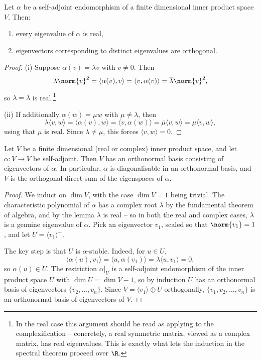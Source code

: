 \begin{lemma}
    Let $\alpha$ be a self-adjoint endomorphism of a finite dimensional inner product space $V$. Then:
    \begin{enumerate}[label=(\roman*)]
        \item every eigenvalue of $\alpha$ is real,
        \item eigenvectors corresponding to distinct eigenvalues are orthogonal.
    \end{enumerate}
\end{lemma}
\begin{proof}
    (i) Suppose $\alpha(v) = \lambda v$ with $v \neq 0$. Then
    $$
    \lambda \norm{v}^2 = \langle \alpha(v), v\rangle = \langle v, \alpha( v)\rangle = \overline{\lambda}\norm{v}^2,
    $$
    so $\lambda = \overline{\lambda}$ is real.\footnote{In the real case this argument should be read as applying to the complexification -- concretely, a real symmetric matrix, viewed as a complex matrix, has real eigenvalues. This is exactly what lets the induction in the spectral theorem proceed over $\R$.}

    (ii) If additionally $\alpha(w) = \mu w$ with $\mu \neq \lambda$, then
    $$
    \lambda \langle v, w \rangle = \langle \alpha(v), w\rangle = \langle v, \alpha(w)\rangle = \overline{\mu}\langle v, w \rangle = \mu \langle v, w\rangle,
    $$
    using that $\mu$ is real. Since $\lambda \neq \mu$, this forces $\langle v, w \rangle = 0$.
\end{proof}

\begin{theorem}
    Let $V$ be a finite dimensional (real or complex) inner product space, and let $\alpha: V \rightarrow V$ be self-adjoint. Then $V$ has an orthonormal basis consisting of eigenvectors of $\alpha$. In particular, $\alpha$ is diagonalisable in an orthonormal basis, and $V$ is the orthogonal direct sum of the eigenspaces of $\alpha$.
\end{theorem}
\begin{proof}
    We induct on $\dim V$, with the case $\dim V = 1$ being trivial. The characteristic polynomial of $\alpha$ has a complex root $\lambda$ by the fundamental theorem of algebra, and by the lemma $\lambda$ is real -- so in both the real and complex cases, $\lambda$ is a genuine eigenvalue of $\alpha$. Pick an eigenvector $v_1$, scaled so that $\norm{v_1} = 1$, and let $U = \langle v_1 \rangle^\perp$.

    The key step is that $U$ is $\alpha$-stable. Indeed, for $u \in U$,
    $$
    \langle \alpha(u), v_1 \rangle = \langle u, \alpha(v_1)\rangle = \lambda \langle u, v_1 \rangle = 0,
    $$
    so $\alpha(u) \in U$. The restriction $\alpha|_U$ is a self-adjoint endomorphism of the inner product space $U$ with $\dim U = \dim V - 1$, so by induction $U$ has an orthonormal basis of eigenvectors $\{v_2, \dots, v_n\}$. Since $V = \langle v_1 \rangle \oplus U$ orthogonally, $\{v_1, v_2, \dots, v_n\}$ is an orthonormal basis of eigenvectors of $V$.
\end{proof}


